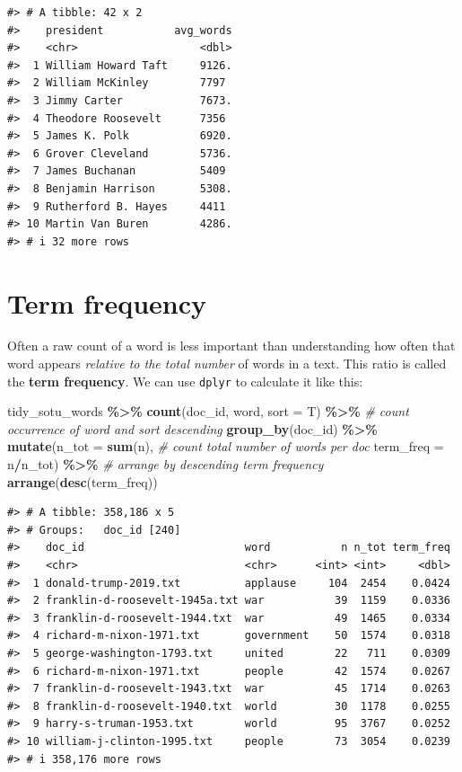 \documentclass[
]{book}
\newenvironment{Shaded}{\begin{snugshade}}{\end{snugshade}}
\newcommand{\AttributeTok}[1]{\textcolor[rgb]{0.13,0.29,0.53}{#1}}
\newcommand{\CommentTok}[1]{\textcolor[rgb]{0.56,0.35,0.01}{\textit{#1}}}
\newcommand{\FunctionTok}[1]{\textcolor[rgb]{0.13,0.29,0.53}{\textbf{#1}}}
\newcommand{\NormalTok}[1]{#1}
\newcommand{\SpecialCharTok}[1]{\textcolor[rgb]{0.81,0.36,0.00}{\textbf{#1}}}
\begin{document}
\begin{verbatim}
#> # A tibble: 42 x 2
#>    president           avg_words
#>    <chr>                   <dbl>
#>  1 William Howard Taft     9126.
#>  2 William McKinley        7797 
#>  3 Jimmy Carter            7673.
#>  4 Theodore Roosevelt      7356 
#>  5 James K. Polk           6920.
#>  6 Grover Cleveland        5736.
#>  7 James Buchanan          5409 
#>  8 Benjamin Harrison       5308.
#>  9 Rutherford B. Hayes     4411 
#> 10 Martin Van Buren        4286.
#> # i 32 more rows
\end{verbatim}

\section{Term frequency}\label{term-frequency}

Often a raw count of a word is less important than understanding how often that word appears \emph{relative to the total number} of words in a text. This ratio is called the \textbf{term frequency}. We can use \texttt{dplyr} to calculate it like this:

\begin{Shaded}
\begin{Highlighting}[]
\NormalTok{tidy\_sotu\_words }\SpecialCharTok{\%\textgreater{}\%}
  \FunctionTok{count}\NormalTok{(doc\_id, word, }\AttributeTok{sort =}\NormalTok{ T)  }\SpecialCharTok{\%\textgreater{}\%}  \CommentTok{\# count occurrence of word and sort descending}
  \FunctionTok{group\_by}\NormalTok{(doc\_id) }\SpecialCharTok{\%\textgreater{}\%} 
  \FunctionTok{mutate}\NormalTok{(}\AttributeTok{n\_tot =} \FunctionTok{sum}\NormalTok{(n),              }\CommentTok{\# count total number of words per doc}
         \AttributeTok{term\_freq =}\NormalTok{ n}\SpecialCharTok{/}\NormalTok{n\_tot) }\SpecialCharTok{\%\textgreater{}\%}     \CommentTok{\# arrange by descending term frequency}
  \FunctionTok{arrange}\NormalTok{(}\FunctionTok{desc}\NormalTok{(term\_freq))}
\end{Highlighting}
\end{Shaded}

\begin{verbatim}
#> # A tibble: 358,186 x 5
#> # Groups:   doc_id [240]
#>    doc_id                         word           n n_tot term_freq
#>    <chr>                          <chr>      <int> <int>     <dbl>
#>  1 donald-trump-2019.txt          applause     104  2454    0.0424
#>  2 franklin-d-roosevelt-1945a.txt war           39  1159    0.0336
#>  3 franklin-d-roosevelt-1944.txt  war           49  1465    0.0334
#>  4 richard-m-nixon-1971.txt       government    50  1574    0.0318
#>  5 george-washington-1793.txt     united        22   711    0.0309
#>  6 richard-m-nixon-1971.txt       people        42  1574    0.0267
#>  7 franklin-d-roosevelt-1943.txt  war           45  1714    0.0263
#>  8 franklin-d-roosevelt-1940.txt  world         30  1178    0.0255
#>  9 harry-s-truman-1953.txt        world         95  3767    0.0252
#> 10 william-j-clinton-1995.txt     people        73  3054    0.0239
#> # i 358,176 more rows
\end{verbatim}
\end{document}
